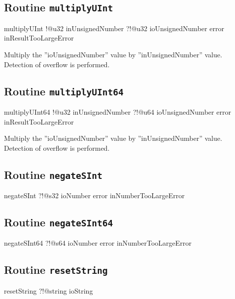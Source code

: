 \subsection{Routine \texttt{multiplyUInt}}

\begin{galgas4}
multiplyUInt !@u32 inUnsignedNumber
             ?!@u32 ioUnsignedNumber
             error inResultTooLargeError
\end{galgas4}

Multiply the ''ioUnsignedNumber'' value by ''inUnsignedNumber'' value. Detection of overflow is performed.

\subsection{Routine \texttt{multiplyUInt64}}

\begin{galgas4}
multiplyUInt64 !@u32 inUnsignedNumber
               ?!@u64 ioUnsignedNumber
               error inResultTooLargeError
\end{galgas4}

Multiply the ''ioUnsignedNumber'' value by ''inUnsignedNumber'' value. Detection of overflow is performed.

\subsection{Routine \texttt{negateSInt}}

\begin{galgas4}
negateSInt ?!@s32 ioNumber
           error inNumberTooLargeError
\end{galgas4}

\subsection{Routine \texttt{negateSInt64}}

\begin{galgas4}
negateSInt64 ?!@s64 ioNumber
             error inNumberTooLargeError
\end{galgas4}


\subsection{Routine \texttt{resetString}}

\begin{galgas4}
resetString ?!@string ioString
\end{galgas4}








